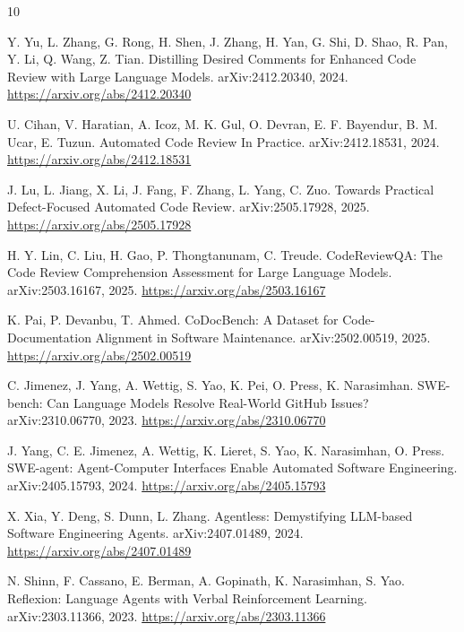 \documentclass[12pt,a4paper]{article}
\begin{document}
\begin{thebibliography}{10}

Y. Yu, L. Zhang, G. Rong, H. Shen, J. Zhang, H. Yan, G. Shi,
D. Shao, R. Pan, Y. Li, Q. Wang, Z. Tian.
\newblock Distilling Desired Comments for Enhanced Code Review with Large Language Models.
\newblock arXiv:2412.20340, 2024.
\newblock \url{https://arxiv.org/abs/2412.20340}

U. Cihan, V. Haratian, A. Icoz, M. K. Gul, O. Devran,
E. F. Bayendur, B. M. Ucar, E. Tuzun.
\newblock Automated Code Review In Practice.
\newblock arXiv:2412.18531, 2024.
\newblock \url{https://arxiv.org/abs/2412.18531}

J. Lu, L. Jiang, X. Li, J. Fang, F. Zhang, L. Yang, C. Zuo.
\newblock Towards Practical Defect-Focused Automated Code Review.
\newblock arXiv:2505.17928, 2025.
\newblock \url{https://arxiv.org/abs/2505.17928}

H. Y. Lin, C. Liu, H. Gao, P. Thongtanunam, C. Treude.
\newblock CodeReviewQA: The Code Review Comprehension Assessment for Large Language Models.
\newblock arXiv:2503.16167, 2025.
\newblock \url{https://arxiv.org/abs/2503.16167}

K. Pai, P. Devanbu, T. Ahmed.
\newblock CoDocBench: A Dataset for Code-Documentation Alignment in Software Maintenance.
\newblock arXiv:2502.00519, 2025.
\newblock \url{https://arxiv.org/abs/2502.00519}

C. Jimenez, J. Yang, A. Wettig, S. Yao, K. Pei, O. Press, K. Narasimhan.
\newblock SWE-bench: Can Language Models Resolve Real-World GitHub Issues?
\newblock arXiv:2310.06770, 2023.
\newblock \url{https://arxiv.org/abs/2310.06770}

J. Yang, C. E. Jimenez, A. Wettig, K. Lieret, S. Yao, K. Narasimhan, O. Press.
\newblock SWE-agent: Agent-Computer Interfaces Enable Automated Software Engineering.
\newblock arXiv:2405.15793, 2024.
\newblock \url{https://arxiv.org/abs/2405.15793}

X. Xia, Y. Deng, S. Dunn, L. Zhang.
\newblock Agentless: Demystifying LLM-based Software Engineering Agents.
\newblock arXiv:2407.01489, 2024.
\newblock \url{https://arxiv.org/abs/2407.01489}

N. Shinn, F. Cassano, E. Berman, A. Gopinath, K. Narasimhan, S. Yao.
\newblock Reflexion: Language Agents with Verbal Reinforcement Learning.
\newblock arXiv:2303.11366, 2023.
\newblock \url{https://arxiv.org/abs/2303.11366}


\end{thebibliography}
\end{document}
